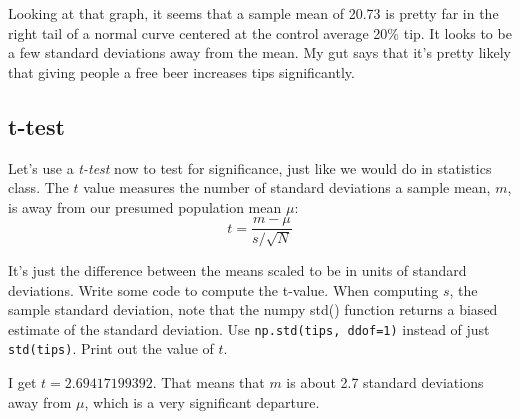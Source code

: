 \begin{fullwidth}

Looking at that graph, it seems that a sample mean of 20.73 is pretty far in the right tail of a normal curve centered at the control average 20\% tip. It looks to be a few standard deviations away from the mean. My gut says that it's pretty likely that giving people a free beer increases tips significantly.

\subsection{t-test}

\setcounter{problem}{0}

\step Let's use a {\em t-test} now to test for significance, just like we would do in statistics class. The $t$ value measures the number of standard deviations a sample mean, $m$, is away from our presumed population mean $\mu$: \\

\[\tag{t-value}
t = \frac{m - \mu}{s / \sqrt{N}}
\]

\noindent It's just the difference between the means scaled to be in units of standard deviations.  Write some code to compute the t-value. When computing $s$, the sample standard deviation, note that the numpy std() function returns a biased estimate of the standard deviation. Use {\tt np.std(tips, ddof=1)} instead of just {\tt std(tips)}. Print out the value of $t$.

I get $t = 2.69417199392$. That means that $m$ is about 2.7 standard deviations away from $\mu$, which is a very significant departure. 


\end{fullwidth}
